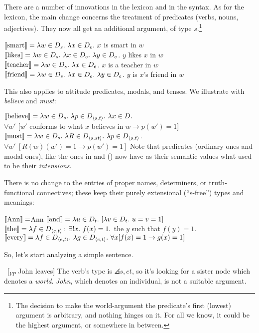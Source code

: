 There are a number of innovations in the lexicon and in the syntax. As for the
lexicon, the main change concerns the treatment of predicates (verbs, nouns,
adjectives). They now all get an additional argument, of type $s$.\footnote{The
  decision to make the world-argument the predicate's first (lowest) argument is
  arbitrary, and nothing hinges on it. For all we know, it could be the highest
  argument, or somewhere in between.}

\pex\label{124}
\a $\llbracket \mbox{smart} \rrbracket = \lambda w\in D_{s}.\ \lambda x\in D_{e}.\ x$ is smart in $w$ 
\a $\sv{\mbox{likes}} = \lambda w\in D_{s}.\ \lambda x\in D_{e}.\ \lambda y\in D_{e}$. $y$ likes $x$ in $w$ 
\a $\sv{\mbox{teacher}} = \lambda w\in D_{s}.\ \lambda x\in D_{e}$. $x$ is a teacher in $w$ 
\a $\sv{\mbox{friend}} = \lambda w\in D_{s}.\ \lambda x\in D_{e}.\ \lambda y\in D_{e}$. $y$ is $x$'s friend in $w$
\xe

This also applies to attitude predicates, modals, and tenses. We illustrate with
\emph{believe} and \emph{must}:

\pex
\a $\sv{\mbox{believe}} = \lambda w\in D_{s}.\ \lambda p\in D_{\angles{s,t}}.\ \lambda x\in D.$ \\
\null\hfill$\forall w'$ [$w'$ conforms to what $x$ believes in $w \rightarrow p(w') = 1$] 
\a $\sv{\mbox{must}} = \lambda w\in D_{s}.\ \lambda R\in D_{\angles{s,st}}.\ \lambda p\in D_{\angles{s,t}}$.\\
\null\hfill$\forall w'\ [R(w)(w') = 1 \rightarrow p(w') = 1]$
\xe
%
Note that predicates (ordinary ones and modal ones), like the ones in 
and (\lastx) now have as their semantic values what used to be their
\emph{intensions}.

There is no change to the entries of proper names, determiners, or
truth-functional connectives; these keep their purely extensional (``s-free'')
types and meanings:

\pex
\a $\llbracket \mbox{Ann} \rrbracket = $Ann 
\a $\llbracket \mbox{and} \rrbracket = \lambda u\in D_{t}.\ [ \lambda v\in D_{t}.\ u=v=1]$ 
\a $\llbracket \mbox{the} \rrbracket = \lambda f\in D_{\langle e,t \rangle}\colon\thinspace \exists !x.\ f(x) = 1.$ the $y$ such that $f(y) = 1$. 
\a $\llbracket \mbox{every} \rrbracket = \lambda f\in D_{\langle e,t \rangle}.\ \lambda g\in D_{\langle e,t \rangle}.\ \forall x [ f(x) = 1 \rightarrow g(x) = 1]$
\xe

So, let's start analyzing a simple sentence.

\ex\ [$_{VP}$ John leaves] \xe
%
The verb's type is $\angles{s,et}$, so it's looking for a sister node which
denotes a \emph{world}. \emph{John}, which denotes an individual, is not a
suitable argument. 

